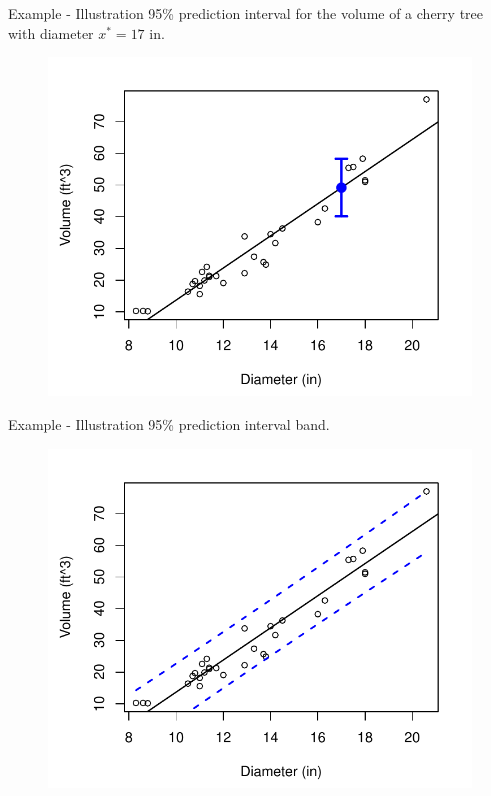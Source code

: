 \documentclass[10pt]{beamer}
\begin{document}
\begin{frame}{Example - Illustration}
95\% prediction interval for the volume of a cherry tree with diameter $x^*=17$ in.
\begin{figure}
\includegraphics[scale=0.65]{figure/scatter6}
\end{figure}
\end{frame}

\begin{frame}{Example - Illustration}
95\% prediction interval band.
\begin{figure}
\includegraphics[scale=0.65]{figure/scatter3}
\end{figure}
\end{frame}
\end{document}
